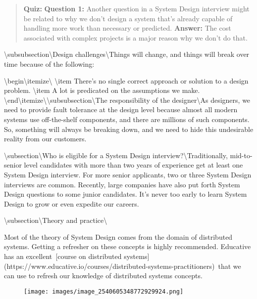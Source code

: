 \begin{quote}
\textbf{Quiz:}
\textbf{Question 1:} Another question in a System Design interview might be related to why we don’t design a system that’s already capable of handling more work than necessary or predicted.
\textbf{Answer:} The cost associated with complex projects is a major reason why we don’t do that.
\end{quote}

\textbackslash{}subsubsection\textbackslash{}{Design challenges\textbackslash{}}Things will change, and things will break over time because of the following:

\textbackslash{}begin\textbackslash{}{itemize\textbackslash{}}
\textbackslash{}item There’s no single correct approach or solution to a design problem.
\textbackslash{}item A lot is predicated on the assumptions we make.
\textbackslash{}end\textbackslash{}{itemize\textbackslash{}}\textbackslash{}subsubsection\textbackslash{}{The responsibility of the designer\textbackslash{}}As designers, we need to provide fault tolerance at the design level because almost all modern systems use off-the-shelf components, and there are millions of such components. So, something will always be breaking down, and we need to hide this undesirable reality from our customers.

\textbackslash{}subsection\textbackslash{}{Who is eligible for a System Design interview?\textbackslash{}}Traditionally, mid-to-senior level candidates with more than two years of experience get at least one System Design interview. For more senior applicants, two or three System Design interviews are common. Recently, large companies have also put forth System Design questions to some junior candidates. It’s never too early to learn System Design to grow or even expedite our careers.

\textbackslash{}subsection\textbackslash{}{Theory and practice\textbackslash{}}

Most of the theory of System Design comes from the domain of distributed systems. Getting a refresher on these concepts is highly recommended. Educative has an excellent [course on distributed systems](https://www.educative.io/courses/distributed-systems-practitioners) that we can use to refresh our knowledge of distributed systems concepts.

\begin{figure}[htbp]
    \centering
    \texttt{[image: images/image\_2540605348772929924.png]}
    
\end{figure}

